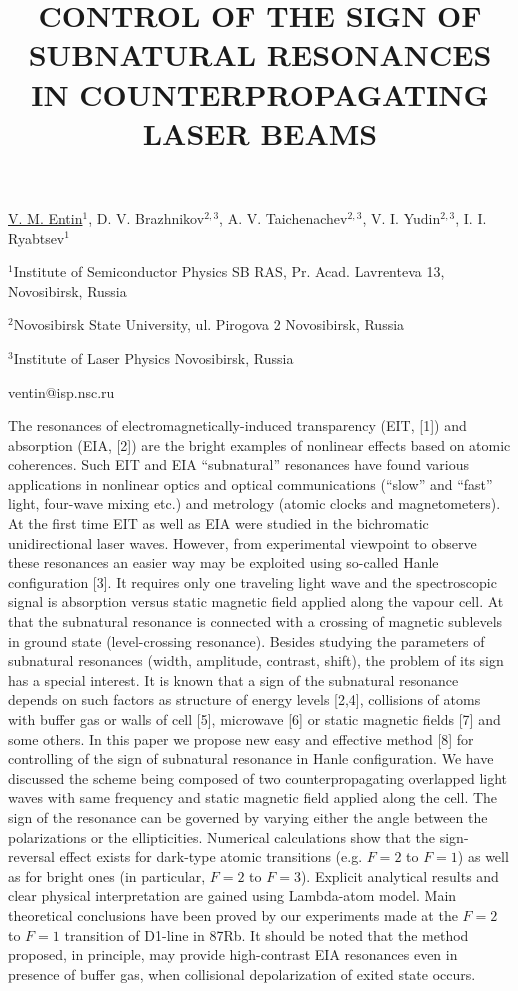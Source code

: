 \title{CONTROL OF THE SIGN OF SUBNATURAL RESONANCES IN COUNTERPROPAGATING LASER BEAMS}

\underline{V. M. Entin}$^1$, D. V. Brazhnikov$^{2,3}$, A. V. Taichenachev$^{2,3}$, V. I. Yudin$^{2,3}$, I. I. Ryabtsev$^1$
    

{\normalsize{
\vspace{-4mm} $^1$Institute of Semiconductor Physics SB RAS, Pr. Acad. Lavrenteva 13, Novosibirsk, Russia

\vspace{-4mm} $^2$Novosibirsk State University, ul. Pirogova 2 Novosibirsk, Russia

\vspace{-4mm} $^3$Institute of Laser Physics Novosibirsk, Russia

\email ventin@isp.nsc.ru}}

The resonances of electromagnetically-induced transparency (EIT, [1]) and absorption (EIA, [2]) are the bright examples of nonlinear effects based on atomic coherences. Such  EIT and EIA ``subnatural'' resonances have found various applications in nonlinear optics and optical communications (``slow'' and ``fast'' light, four-wave mixing etc.) and metrology (atomic clocks and magnetometers). At the first time EIT as well as EIA were studied in the bichromatic unidirectional laser waves. However, from experimental viewpoint to observe these resonances an easier way may be exploited using so-called Hanle configuration [3]. It requires only one traveling light wave and the spectroscopic signal is absorption versus static magnetic field applied along the vapour cell. At that the subnatural resonance is connected with a crossing of magnetic sublevels in ground state (level-crossing resonance).
Besides studying the parameters of subnatural resonances (width, amplitude, contrast, shift), the problem of its sign has a special interest. It is known that a sign of the subnatural resonance depends on such factors as structure of energy levels [2,4], collisions of atoms with buffer gas or walls of cell [5], microwave [6] or static magnetic fields [7] and some others. In this paper we propose new easy and effective method [8] for controlling of the sign of subnatural resonance in Hanle configuration. We have discussed the scheme being composed of two counterpropagating overlapped light waves with same frequency and static magnetic field applied along the cell. The sign of the resonance can be governed by varying either the angle between the polarizations or the ellipticities. Numerical calculations show that the sign-reversal effect exists for dark-type atomic transitions (e.g. $F=2$ to $F=1$) as well as for bright ones (in particular, $F=2$ to $F=3$). Explicit analytical results and clear physical interpretation are gained using Lambda-atom model. Main theoretical conclusions have been proved by our experiments made at the $F=2$ to $F=1$ transition of D1-line in 87Rb. It should be noted that the method proposed, in principle, may provide high-contrast EIA resonances even in presence of buffer gas, when collisional depolarization of exited state occurs.

